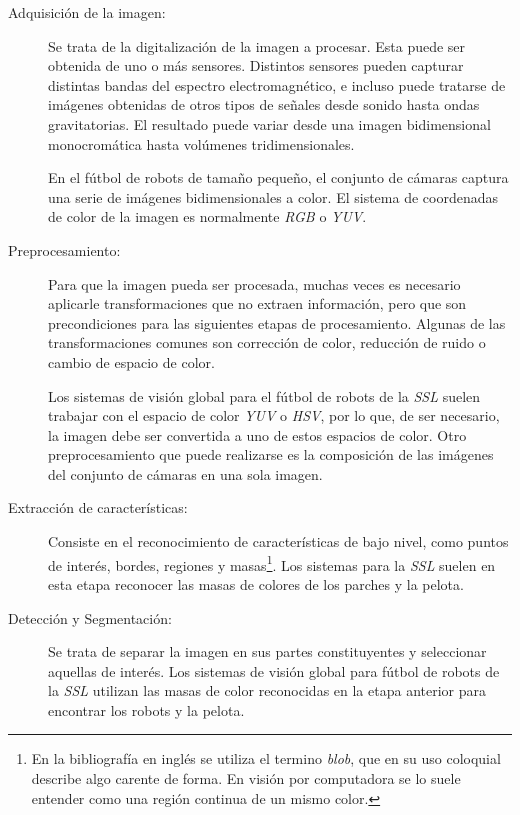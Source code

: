 \begin{description}

	\item[Adquisición de la imagen:] Se trata de la digitalización de la
		imagen a procesar. Esta puede ser obtenida de uno o más
		sensores. Distintos sensores pueden capturar distintas bandas
		del espectro electromagnético, e incluso puede tratarse de
		imágenes obtenidas de otros tipos de señales desde sonido
		hasta ondas gravitatorias. El resultado puede variar desde una
		imagen bidimensional monocromática hasta volúmenes
		tridimensionales.

		En el fútbol de robots de tamaño pequeño, el conjunto de cámaras
		captura una serie de imágenes bidimensionales a color. El
		sistema de coordenadas de color de la imagen es normalmente
		\emph{RGB} o \emph{YUV}.

	\item[Preprocesamiento:] Para que la imagen pueda ser procesada, muchas
		veces es necesario aplicarle transformaciones que no extraen
		información, pero que son precondiciones para las siguientes
		etapas de procesamiento. Algunas de las transformaciones comunes
		son corrección de color, reducción de ruido o cambio de espacio
		de color.

		Los sistemas de visión global para el fútbol de robots de la
		\emph{SSL} suelen trabajar con el espacio de color \emph{YUV}
		o \emph{HSV}, por lo que, de ser necesario, la imagen debe ser
		convertida a uno de estos espacios de color. Otro
		preprocesamiento que puede realizarse es la composición de las
		imágenes del conjunto de cámaras en una sola imagen.

	\item[Extracción de características:] Consiste en el reconocimiento de
		características de bajo nivel, como puntos de interés, bordes,
		regiones y masas\footnote{En la bibliografía en inglés se
		utiliza el termino \emph{blob}, que en su uso coloquial
		describe algo carente de forma. En visión por computadora se
		lo suele entender como una región continua de un mismo
		color.}. Los sistemas para la \emph{SSL} suelen en esta etapa
		reconocer las masas de colores de los parches y la pelota.

	\item[Detección y Segmentación:] Se trata de separar la imagen en sus
		partes constituyentes y seleccionar aquellas de interés. Los
		sistemas de visión global para fútbol de robots de la \emph{SSL}
		utilizan las masas de color reconocidas en la etapa anterior
		para encontrar los robots y la pelota.


\end{description}
